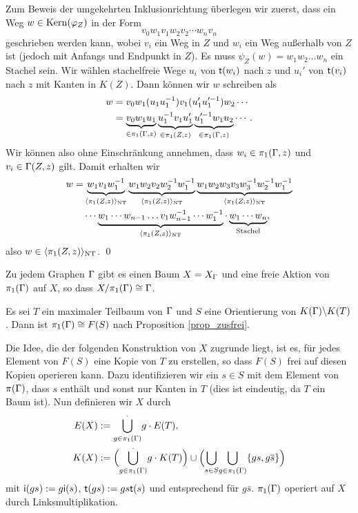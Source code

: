 \documentclass[a4paper, 12pt, twoside]{article}
\begin{document}
Zum Beweis der umgekehrten Inklusionrichtung überlegen wir zuerst,
dass ein Weg $w\in \mathrm{Kern}(\varphi_Z)$ in der Form
\[
v_0 w_1 v_1 w_2 v_2 \cdots w_n v_n
\]
geschrieben werden kann, wobei $v_i$ ein Weg in $Z$ und $w_i$ ein
Weg außerhalb von $Z$ ist (jedoch mit Anfangs und Endpunkt in $Z$).
Es muss $\psi_Z(w)=w_1 w_2 \ldots w_n$ ein Stachel sein.
Wir wählen stachelfreie Wege $u_i$ von $\mathsf{t}(w_i)$ nach
$z$ und $u_i'$ von $\mathsf{t}(v_i)$ nach $z$ mit Kanten in $K(Z)$.
Dann können wir $w$ schreiben als
\begin{align*}
w &= v_0 w_1 (u_1 u_1^{-1}) v_1 (u_1' u_1'^{-1}) w_2 \cdots \\
&=\underbrace{v_0 w_1 u_1}_{\in \pi_1(\Gamma,z)}
\underbrace{u_1^{-1} v_1 u_1'}_{\in \pi_1(Z,z)}
\underbrace{u_1'^{-1} w_1 u_2}_{\in \pi_1(\Gamma,z)} \cdots .
\end{align*}
Wir können also ohne Einschränkung annehmen, dass
$w_i\in\pi_1(\Gamma,z)$ und $v_i\in\Gamma(Z,z)$ gilt. Damit erhalten wir
\begin{align*}
w =&
\underbrace{w_1 v_1 w_1^{-1}}_{\langle \pi_1(Z,z)\rangle_{\mathrm{NT}}}
\underbrace{w_1 w_2 v_2 w_2^{-1} w_1^{-1}}_{\langle \pi_1(Z,z)\rangle_{\mathrm{NT}}}
\underbrace{w_1 w_2 w_3 v_3 w_3^{-1} w_2^{-1} w_1^{-1}}_{\langle \pi_1(Z,z)\rangle_{\mathrm{NT}}}\\
&\cdots
\underbrace{w_1\cdots w_{n-1}\ldots v_1 w_{n-1}^{-1}\cdots w_1^{-1}}_{\langle \pi_1(Z,z)\rangle_{\mathrm{NT}}}
\cdot
\underbrace{w_1\cdots w_n}_{\text{Stachel}},
\end{align*}
also $w\in\langle \pi_1(Z,z)\rangle_{\mathrm{NT}}$.
\qed

\PROP Zu jedem Graphen $\Gamma$ gibt es einen Baum $X=X_{\Gamma}$ und eine
freie Aktion von $\pi_1(\Gamma)$ auf $X$, so dass
$X/\pi_1(\Gamma)\cong \Gamma$.

\bew
Es sei $T$ ein maximaler Teilbaum von $\Gamma$ und $S$ eine Orientierung
von $K(\Gamma)\backslash K(T)$. Dann ist $\pi_1(\Gamma)\cong F(S)$
nach Proposition \ref{prop_zusfrei}.

Die Idee, die der folgenden Konstruktion von $X$ zugrunde liegt,
ist es, für jedes Element von $F(S)$ eine Kopie von
$T$ zu erstellen, so dass $F(S)$ frei auf diesen Kopien operieren
kann. Dazu identifizieren wir ein $s\in S$ mit dem Element
von $\pi(\Gamma)$, dass $s$ enthält und sonst nur Kanten in $T$
(dies ist eindeutig, da $T$ ein Baum ist).
Nun definieren wir $X$ durch
\begin{align*}
E(X) &:= \overset{.}{\underset{g\in\pi_1(\Gamma)}{\mathop{\bigcup}}} g\cdot E(T), \\
K(X) &:= \Bigl(\overset{.}{\underset{g\in\pi_1(\Gamma)}{\mathop{\bigcup}}} g\cdot K(T)\Bigr)
\cup
\Bigl(\overset{}{\underset{s\in S}{\mathop{\bigcup}}}\overset{}{\underset{g\in\pi_1(\Gamma)}{\mathop{\bigcup}}} \{gs, g\overline{s} \}\Bigr)
\end{align*}
mit $\mathsf{i}(gs):=g\mathsf{i}(s)$, $\mathsf{t}(gs):=gs\mathsf{t}(s)$ und entsprechend
für $g\bar{s}$.
$\pi_1(\Gamma)$ operiert auf $X$ durch Linksmultiplikation.
\end{document}
